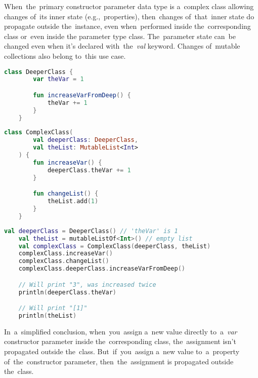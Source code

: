 \warning When~the~primary constructor parameter data type is a~complex class allowing changes of~its inner state (e.g.,~properties), then~changes of~that~inner state do propagate outside the~instance, even when~performed inside the~corresponding class or~even inside the parameter type class.
The~parameter state can~be changed even when it's declared \mbox{with the \textit{val}} keyword.
Changes of~mutable collections also belong to~this use case.

\example
\begin{lstlisting}[language=Kotlin, title={Class to be a type of a constructor parameter}]
    class DeeperClass {
        var theVar = 1

        fun increaseVarFromDeep() {
            theVar += 1
        }
    }
\end{lstlisting}
\begin{lstlisting}[language=Kotlin, title={Class with complex parameters in the primary constructor}]
    class ComplexClass(
        val deeperClass: DeeperClass,
        val theList: MutableList<Int>
    ) {
        fun increaseVar() {
            deeperClass.theVar += 1
        }

        fun changeList() {
            theList.add(1)
        }
    }
\end{lstlisting}
\newpage

\begin{lstlisting}[language=Kotlin, title={Behavior}]
    val deeperClass = DeeperClass() // 'theVar' is 1
    val theList = mutableListOf<Int>() // empty list
    val complexClass = ComplexClass(deeperClass, theList)
    complexClass.increaseVar()
    complexClass.changeList()
    complexClass.deeperClass.increaseVarFromDeep()

    // Will print "3", was increased twice
    println(deeperClass.theVar)

    // Will print "[1]"
    println(theList)
\end{lstlisting}
\newline

\noindent In~a~simplified conclusion, when~you~assign a~new value directly to~a~\textit{var} constructor parameter inside the~corresponding class, the~assignment isn't propagated outside the~class.
But~if~you~assign a~new value to~a~property of~the~constructor parameter, then~the~assignment is propagated outside the~class.
\newline

